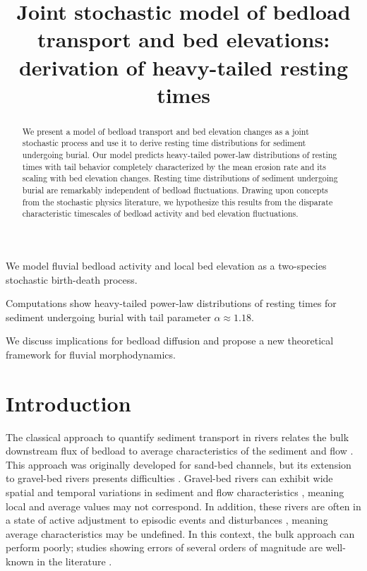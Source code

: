 \documentclass[draft]{agujournal2018}
\begin{document}
\title{Joint stochastic model of bedload transport and bed elevations: derivation of heavy-tailed resting times}

\begin{keypoints}
\item We model fluvial bedload activity and local bed elevation as a two-species stochastic birth-death process.
\item Computations show heavy-tailed power-law distributions of resting times for sediment undergoing burial with tail parameter $\alpha\approx 1.18$.
\item We discuss implications for bedload diffusion and propose a new theoretical framework for fluvial morphodynamics.

\end{keypoints}

\begin{abstract}
We present a model of bedload transport and bed elevation changes as a joint stochastic process and use it to derive resting time distributions for sediment undergoing burial.
Our model predicts heavy-tailed power-law distributions of resting times with tail behavior completely characterized by the mean erosion rate and its scaling with bed elevation changes.
Resting time distributions of sediment undergoing burial are remarkably independent of bedload fluctuations.
Drawing upon concepts from the stochastic physics literature, we hypothesize this results from the disparate characteristic timescales of bedload activity and bed elevation fluctuations.
\end{abstract} 

\section{Introduction}

The classical approach to quantify sediment transport in rivers relates the bulk downstream flux of bedload to average characteristics of the sediment and flow \citep[e.g.][]{Yalin1972}.
This approach was originally developed for sand-bed channels, but its extension to gravel-bed rivers presents difficulties \citep[e.g.][]{Hassan2013}.
Gravel-bed rivers can exhibit wide spatial and temporal variations in sediment and flow characteristics \citep[e.g.][]{Hassan2008}, meaning local and average values may not correspond.
In addition, these rivers are often in a state of active adjustment to episodic events and disturbances \citep[e.g.][]{Church2015}, meaning average characteristics may be undefined.
In this context, the bulk approach can perform poorly; studies showing errors of several orders of magnitude are well-known in the literature \citep[e.g.][]{Gomez1989,Recking2012}.
\end{document}
